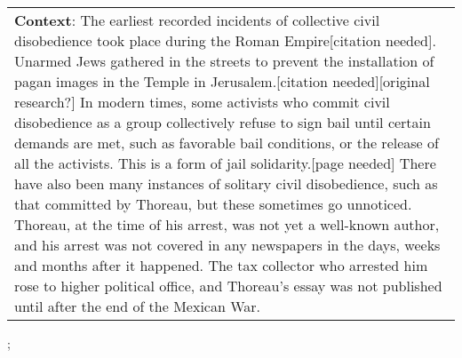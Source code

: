 \begin{figure*}[ht]
{\begin{tabular}{p{}}
            \textbf{Context}: The earliest recorded incidents of collective civil disobedience took place during the Roman Empire[citation needed]. Unarmed Jews gathered in the streets to prevent the installation of pagan images in the Temple in Jerusalem.[citation needed][original research?] In modern times, some activists who commit civil disobedience as a group collectively refuse to sign bail until certain demands are met, such as favorable bail conditions, or the release of all the activists. This is a form of jail solidarity.[page needed] There have also been many instances of solitary civil disobedience, such as that committed by Thoreau, but these sometimes go unnoticed. Thoreau, at the time of his arrest, was not yet a well-known author, and his arrest was not covered in any newspapers in the days, weeks and months after it happened. The tax collector who arrested him rose to higher political office, and Thoreau's essay was not published until after the end of the Mexican War. \\
        \end{tabular}
    };
    \label{fig:ex-572822233acd2414000df557}
\end{figure*}

